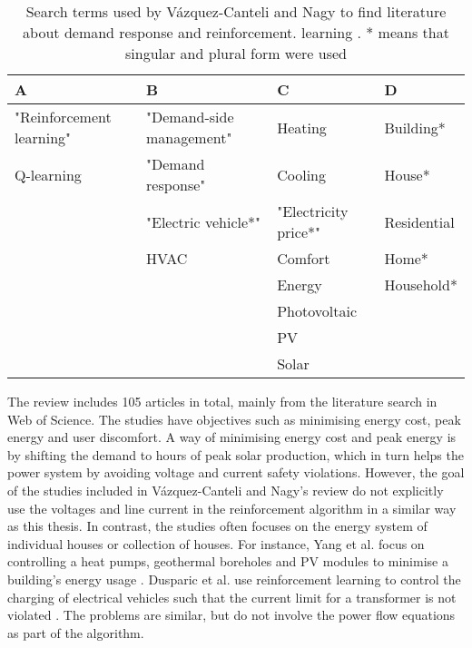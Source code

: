 \documentclass[class=book, crop=false]{standalone}
\begin{document}
\begin{table}[ht]
\centering
\begin{tabular}{llll}
A                        & B                        & C                    & D           \\
\hline
"Reinforcement learning" & "Demand-side management" & Heating              & Building*   \\
Q-learning               & "Demand response"        & Cooling              & House*      \\
                         & "Electric vehicle*"      & "Electricity price*" & Residential \\
                         & HVAC                     & Comfort              & Home*       \\
                         &                          & Energy               & Household*  \\
                         &                          & Photovoltaic         &             \\
                         &                          & PV                   &             \\
                         &                          & Solar                &            
                        \\
                        \hline
\end{tabular}
\caption{Search terms used by Vázquez-Canteli and Nagy to find literature about demand response and reinforcement. learning \cite{vazquez2019reinforcement}. * means that singular and plural form were used}
\label{table:soa:searchterms}
\end{table}

The review includes 105 articles in total, mainly from the literature search in Web of Science. The studies have objectives such as minimising energy cost, peak energy and user discomfort. A way of minimising energy cost and peak energy is by shifting the demand to hours of peak solar production, which in turn helps the power system by avoiding voltage and current safety violations. However, the goal of the studies included in Vázquez-Canteli and Nagy's review do not explicitly use the voltages and line current in the reinforcement algorithm in a similar way as this thesis. In contrast, the studies often focuses on the energy system of individual houses or collection of houses. For instance,  Yang et al. focus on controlling a heat pumps, geothermal boreholes and PV modules to minimise a building's energy usage \cite{yang2015reinforcement}.  Dusparic et al. use reinforcement learning to control the charging of electrical vehicles such that the current limit for a transformer is not violated \cite{dusparic2013multi}. The problems are similar, but do not involve the power flow equations as part of the algorithm.
\end{document}
